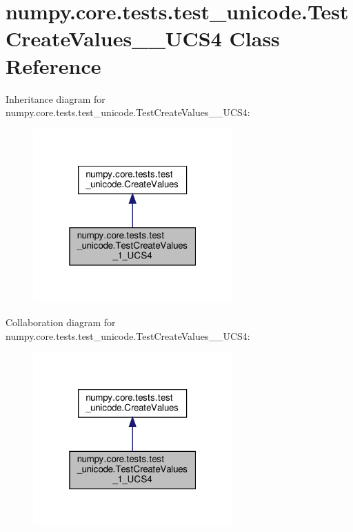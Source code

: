 \hypertarget{classnumpy_1_1core_1_1tests_1_1test__unicode_1_1TestCreateValues__1__UCS4}{}\section{numpy.\+core.\+tests.\+test\+\_\+unicode.\+Test\+Create\+Values\+\_\+\_\+\+U\+C\+S4 Class Reference}
\label{classnumpy_1_1core_1_1tests_1_1test__unicode_1_1TestCreateValues__1__UCS4}


Inheritance diagram for numpy.\+core.\+tests.\+test\+\_\+unicode.\+Test\+Create\+Values\+\_\+\_\+\+U\+C\+S4\+:
\nopagebreak
\begin{figure}[H]
\begin{center}
\leavevmode
\includegraphics[width=217pt]{classnumpy_1_1core_1_1tests_1_1test__unicode_1_1TestCreateValues__1__UCS4__inherit__graph}
\end{center}
\end{figure}


Collaboration diagram for numpy.\+core.\+tests.\+test\+\_\+unicode.\+Test\+Create\+Values\+\_\+\_\+\+U\+C\+S4\+:
\nopagebreak
\begin{figure}[H]
\begin{center}
\leavevmode
\includegraphics[width=217pt]{classnumpy_1_1core_1_1tests_1_1test__unicode_1_1TestCreateValues__1__UCS4__coll__graph}
\end{center}
\end{figure}
